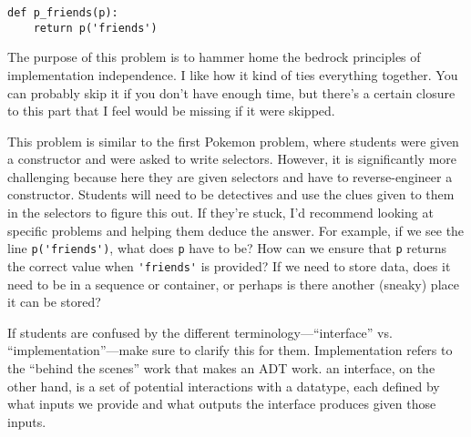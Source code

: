 \begin{parts}
\begin{blocksection}
    \begin{lstlisting}
def p_friends(p):
    return p('friends')
    \end{lstlisting}
    
    \end{blocksection}
    
    \begin{questionmeta}
        The purpose of this problem is to hammer home the bedrock principles of implementation independence. I like 
        how it kind of ties everything together. You can probably skip it if you don't have enough time, but there's a 
        certain closure to this part that I feel would be missing if it were skipped. 

        This problem is similar to the first Pokemon problem, where students were given a constructor and were
        asked to write selectors. However, it is significantly more challenging because here they are given
        selectors and have to reverse-engineer a constructor. Students will need to be detectives and use
        the clues given to them in the selectors to figure this out. If they're stuck, I'd recommend looking 
        at specific problems and helping them deduce the answer. For example, if we see the line \lstinline{p('friends')},
        what does \lstinline{p} have to be? How can we ensure that \lstinline{p} returns the correct value when
        \lstinline{'friends'} is provided? If we need to store data, does it need to be in a sequence or container,
        or perhaps is there another (sneaky) place it can be stored? 

        If students are confused by the different terminology---``interface'' vs. ``implementation''---make sure to
        clarify this for them. Implementation refers to the ``behind the scenes'' work that makes an ADT work. an
        interface, on the other hand, is a set of potential interactions with a datatype, each defined by
        what inputs we provide and what outputs the interface produces given those inputs. 
    \end{questionmeta}



\end{parts}
